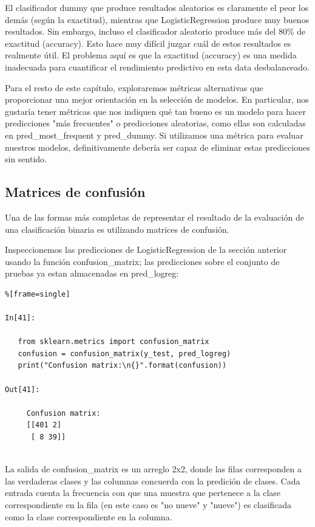 {\begin{lstlisting}
\end{lstlisting}

El clasificador dummy que produce resultados aleatorios es claramente el peor los demás (según la  exactitud), mientras que {\ttfamily LogisticRegression} produce muy buenos resultados.
Sin embargo, incluso el clasificador aleatorio produce más del 80\% de  exactitud (accuracy). Esto  hace muy
 difícil juzgar cuál de estos resultados es realmente útil. El problema aquí es que la  exactitud (accuracy)  es una medida inadecuada para cuantificar el rendimiento predictivo en esta data desbalanceado.

Para el resto de este capítulo, exploraremos métricas alternativas que proporcionar una mejor orientación en la selección de modelos. En particular, nos gustaría tener métricas  que nos indiquen qué tan bueno es un modelo para  hacer predicciones  "{}más frecuentes"{}  o  predicciones aleatorias, como ellas son  calculadas   en { \ttfamily pred\_most\_frequent}  y  {\ttfamily pred\_dummy}.
 Si utilizamos una métrica para evaluar nuestros modelos, definitivamente debería ser capaz de
eliminar estas predicciones sin sentido.


\subsection{Matrices de confusión} 

Una de las formas más completas de representar el resultado de la evaluación de una clasificación 
binaria es utilizando matrices de confusión.  

Inspeccionemos las predicciones de {\ttfamily LogisticRegression} de la sección anterior usando 
 la función  {\ttfamily confusion\_matrix};   las predicciones sobre el conjunto de  pruebas  ya estan almacenadas en  {\ttfamily pred\_logreg}:


\begin{lstlisting}%[frame=single]

In[41]:

   from sklearn.metrics import confusion_matrix
   confusion = confusion_matrix(y_test, pred_logreg)
   print("Confusion matrix:\n{}".format(confusion))

Out[41]:
    
     Confusion matrix:
     [[401 2]
      [ 8 39]]
     
\end{lstlisting}


La salida de {\ttfamily confusion\_matrix} es un arreglo  2x2,  donde las filas corresponden
a las  verdaderas   clases  y las columnas concuerda con la predición de clases.    Cada  entrada cuenta la frecuencia con que una muestra que pertenece a la clase correspondiente en la fila  (en este caso es  "{}no nueve"{} y "{}nueve{}") es clasificada como la clase correspondiente en la columna.


}
